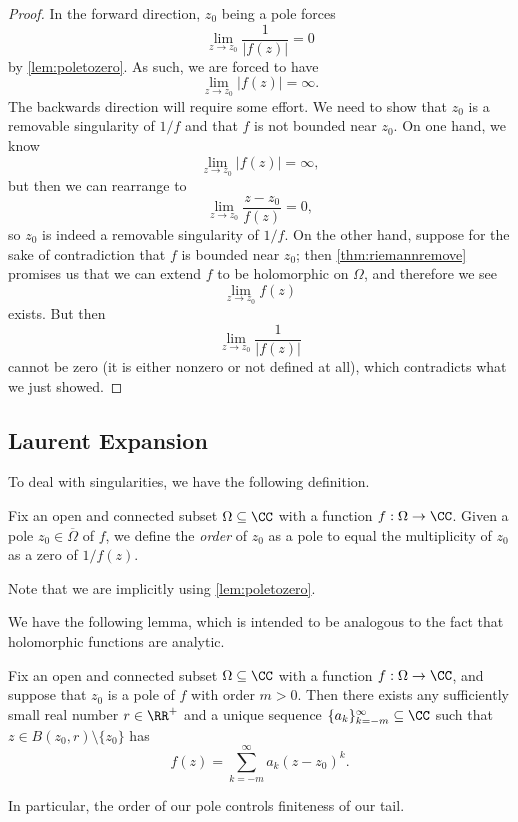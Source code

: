 \begin{proof}
	In the forward direction, $z_0$ being a pole forces
	\[\lim_{z\to z_0}\frac1{|f(z)|}=0\]
	by \autoref{lem:poletozero}. As such, we are forced to have
	\[\lim_{z\to z_0}|f(z)|=\infty.\]
	The backwards direction will require some effort. We need to show that $z_0$ is a removable singularity of $1/f$ and that $f$ is not bounded near $z_0$. On one hand, we know
	\[\lim_{z\to z_0}|f(z)|=\infty,\]
	but then we can rearrange to
	\[\lim_{z\to z_0}\frac{z-z_0}{f(z)}=0,\]
	so $z_0$ is indeed a removable singularity of $1/f$. On the other hand, suppose for the sake of contradiction that $f$ is bounded near $z_0$; then \autoref{thm:riemannremove} promises us that we can extend $f$ to be holomorphic on $\Omega$, and therefore we see
	\[\lim_{z\to z_0}f(z)\]
	exists. But then
	\[\lim_{z\to z_0}\frac1{|f(z)|}\]
	cannot be zero (it is either nonzero or not defined at all), which contradicts what we just showed.
\end{proof}

\subsection{Laurent Expansion}
To deal with singularities, we have the following definition.
\begin{definition}[Order]
	Fix an open and connected subset $\Omega\subseteq\CC$ with a function $f:\Omega\to\CC$. Given a pole $z_0\in\overline\Omega$ of $f$, we define the \textit{order} of $z_0$ as a pole to equal the multiplicity of $z_0$ as a zero of $1/f(z)$.
\end{definition}
Note that we are implicitly using \autoref{lem:poletozero}.

We have the following lemma, which is intended to be analogous to the fact that holomorphic functions are analytic.
\begin{lemma} \label{lem:laurent}
	Fix an open and connected subset $\Omega\subseteq\CC$ with a function $f:\Omega\to\CC$, and suppose that $z_0$ is a pole of $f$ with order $m>0$. Then there exists any sufficiently small real number $r\in\RR^+$ and a unique sequence $\{a_k\}_{k=-m}^\infty\subseteq\CC$ such that $z\in B(z_0,r)\setminus\{z_0\}$ has
	\[f(z)=\sum_{k=-m}^\infty a_k(z-z_0)^k.\]
\end{lemma}
In particular, the order of our pole controls finiteness of our tail.

